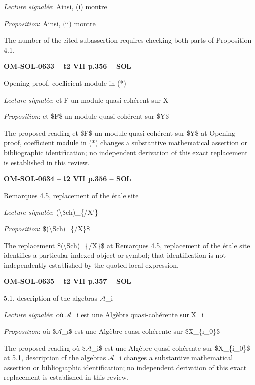 \emph{Lecture signalée}: Ainsi, (i) montre\par
\emph{Proposition}: Ainsi, (ii) montre\par
The number of the cited subassertion requires checking both parts of Proposition 4.1.\par
\par\noindent\textbf{OM-SOL-0633 -- t2 VII p.356 -- SOL}\par
Opening proof, coefficient module in (*)\par
\emph{Lecture signalée}: et F un module quasi-cohérent sur X\par
\emph{Proposition}: et \$F\$ un module quasi-cohérent sur \$Y\$\par
The proposed reading et \$F\$ un module quasi-cohérent sur \$Y\$ at Opening proof, coefficient module in (*) changes a substantive mathematical assertion or bibliographic identification; no independent derivation of this exact replacement is established in this review.\par
\par\noindent\textbf{OM-SOL-0634 -- t2 VII p.356 -- SOL}\par
Remarques 4.5, replacement of the étale site\par
\emph{Lecture signalée}: (\textbackslash{}Sch)\_\{/X'\}\par
\emph{Proposition}: \$(\textbackslash{}Sch)\_\{/X\}\$\par
The replacement \$(\textbackslash{}Sch)\_\{/X\}\$ at Remarques 4.5, replacement of the étale site identifies a particular indexed object or symbol; that identification is not independently established by the quoted local expression.\par
\par\noindent\textbf{OM-SOL-0635 -- t2 VII p.357 -- SOL}\par
5.1, description of the algebras \ensuremath{𝒜}\_i\par
\emph{Lecture signalée}: où \ensuremath{𝒜}\_i est une Algèbre quasi-cohérente sur X\_i\par
\emph{Proposition}: où \$\ensuremath{𝒜}\_i\$ est une Algèbre quasi-cohérente sur \$X\_\{i\_0\}\$\par
The proposed reading où \$\ensuremath{𝒜}\_i\$ est une Algèbre quasi-cohérente sur \$X\_\{i\_0\}\$ at 5.1, description of the algebras \ensuremath{𝒜}\_i changes a substantive mathematical assertion or bibliographic identification; no independent derivation of this exact replacement is established in this review.\par
